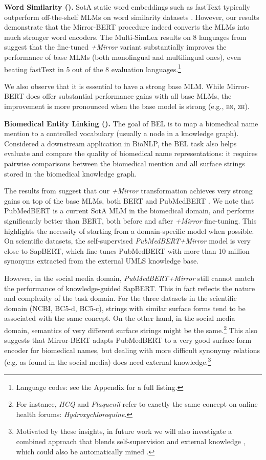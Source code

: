 \documentclass[11pt]{article}
\begin{document}
\noindent \textbf{Word Similarity ().}
SotA static word embeddings such as fastText \citep{mikolov2018advances} typically outperform off-the-shelf MLMs on word similarity datasets  \cite{vulic2020multi}. However, our results demonstrate that the Mirror-BERT procedure indeed converts the MLMs into much stronger word encoders. The Multi-SimLex results on 8 languages from  suggest that the fine-tuned \textit{+Mirror} variant substantially improves the performance of base MLMs (both monolingual and multilingual ones), even beating fastText in 5 out of the 8 evaluation languages.\footnote{Language codes: see the Appendix for a full listing.}

We also observe that it is essential to have a strong base MLM. While Mirror-BERT does offer substantial performance gains with all base MLMs, the improvement is more pronounced when the base model is strong (e.g., \textsc{en}, \textsc{zh}).


\vspace{1.2mm}
\noindent \textbf{Biomedical Entity Linking ().}
The goal of BEL is to map a biomedical name mention to a controlled vocabulary (usually a node in a knowledge graph). Considered a downstream application in BioNLP, the BEL task also helps evaluate and compare the quality of biomedical name representations: it requires pairwise comparisons between the biomedical mention and all surface strings stored in the biomedical knowledge graph.

The results from  suggest that our \textit{+Mirror} transformation achieves very strong gains on top of the base MLMs, both BERT and PubMedBERT \citep{pubmedbert}.
We note that PubMedBERT is a current SotA MLM in the biomedical domain, and performs significantly better than BERT, both before and after \textit{+Mirror} fine-tuning. This highlights the necessity of starting from a domain-specific model when possible. On scientific datasets, the self-supervised \textit{PubMedBERT+Mirror} model is very close to SapBERT, which fine-tunes PubMedBERT with more than 10 million synonyms extracted from the external UMLS knowledge base. 

However, in the social media domain, \textit{PubMedBERT+Mirror} still cannot match the performance of  knowledge-guided SapBERT. This in fact reflects the nature and complexity of the task domain. For the three datasets in the scientific domain (NCBI, BC5-d, BC5-c), strings with similar surface forms tend to be associated with the same concept. On the other hand, in the social media domain, semantics of very different surface strings might be the same.\footnote{For instance, \emph{HCQ} and \emph{Plaquenil} refer to exactly the same concept on online health forums: \emph{Hydroxychloroquine}.} This also suggests that Mirror-BERT adapts PubMedBERT to a very good surface-form encoder for biomedical names, but dealing with more difficult synonymy relations (e.g. as found in the social media) does need external knowledge.\footnote{Motivated by these insights, in future work we will also investigate a combined approach that blends self-supervision and external knowledge \citep{Vulic:2021lexfit}, which could also be automatically mined \citep{simbert,thakur-etal-2021-augmented}.}
\end{document}

